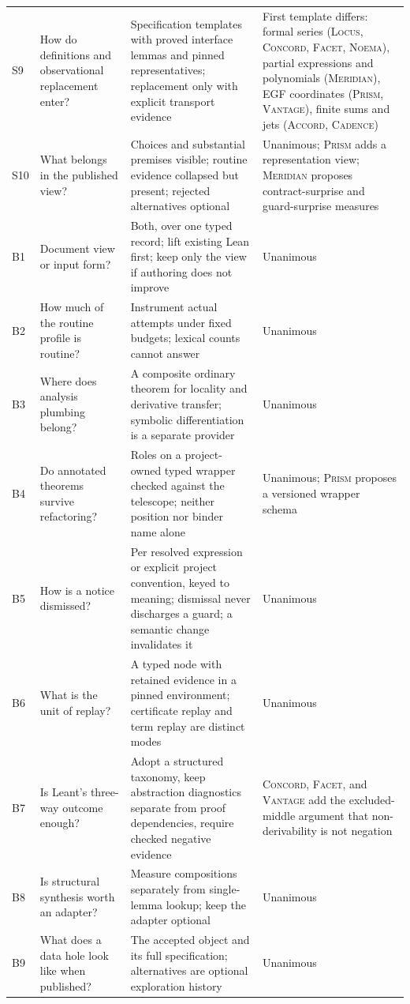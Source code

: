 \documentclass[11pt,a4paper]{article}
\newcommand{\Lc}{\textsc{Locus}}
\newcommand{\Ac}{\textsc{Accord}}
\newcommand{\Cd}{\textsc{Cadence}}
\newcommand{\Cc}{\textsc{Concord}}
\newcommand{\Fc}{\textsc{Facet}}
\newcommand{\Md}{\textsc{Meridian}}
\newcommand{\Nm}{\textsc{Noema}}
\newcommand{\Pm}{\textsc{Prism}}
\newcommand{\Vt}{\textsc{Vantage}}
\theoremstyle{definition}
\begin{document}
\begin{longtable}{@{}L{8mm}L{32mm}L{60mm}L{47mm}@{}}
S9 & How do definitions and observational replacement enter? & Specification templates with proved interface lemmas and pinned representatives; replacement only with explicit transport evidence & First template differs: formal series (\Lc, \Cc, \Fc, \Nm), partial expressions and polynomials (\Md), EGF coordinates (\Pm, \Vt), finite sums and jets (\Ac, \Cd)\\
S10 & What belongs in the published view? & Choices and substantial premises visible; routine evidence collapsed but present; rejected alternatives optional & Unanimous; \Pm{} adds a representation view; \Md{} proposes contract-surprise and guard-surprise measures\\
\midrule
B1 & Document view or input form? & Both, over one typed record; lift existing Lean first; keep only the view if authoring does not improve & Unanimous\\
B2 & How much of the routine profile is routine? & Instrument actual attempts under fixed budgets; lexical counts cannot answer & Unanimous\\
B3 & Where does analysis plumbing belong? & A composite ordinary theorem for locality and derivative transfer; symbolic differentiation is a separate provider & Unanimous\\
B4 & Do annotated theorems survive refactoring? & Roles on a project-owned typed wrapper checked against the telescope; neither position nor binder name alone & Unanimous; \Pm{} proposes a versioned wrapper schema\\
B5 & How is a notice dismissed? & Per resolved expression or explicit project convention, keyed to meaning; dismissal never discharges a guard; a semantic change invalidates it & Unanimous\\
B6 & What is the unit of replay? & A typed node with retained evidence in a pinned environment; certificate replay and term replay are distinct modes & Unanimous\\
B7 & Is Leant's three-way outcome enough? & Adopt a structured taxonomy, keep abstraction diagnostics separate from proof dependencies, require checked negative evidence & \Cc, \Fc, and \Vt{} add the excluded-middle argument that non-derivability is not negation\\
B8 & Is structural synthesis worth an adapter? & Measure compositions separately from single-lemma lookup; keep the adapter optional & Unanimous\\
B9 & What does a data hole look like when published? & The accepted object and its full specification; alternatives are optional exploration history & Unanimous\\

\end{longtable}
\end{document}
